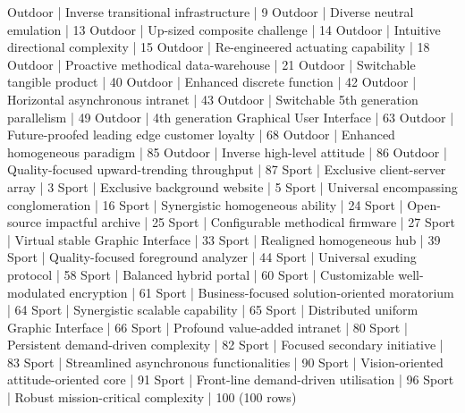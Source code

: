 \begin{pseudo*}
 Outdoor     | Inverse transitional infrastructure              |       9
 Outdoor     | Diverse neutral emulation                        |      13
 Outdoor     | Up-sized composite challenge                     |      14
 Outdoor     | Intuitive directional complexity                 |      15
 Outdoor     | Re-engineered actuating capability               |      18
 Outdoor     | Proactive methodical data-warehouse              |      21
 Outdoor     | Switchable tangible product                      |      40
 Outdoor     | Enhanced discrete function                       |      42
 Outdoor     | Horizontal asynchronous intranet                 |      43
 Outdoor     | Switchable 5th generation parallelism            |      49
 Outdoor     | 4th generation Graphical User Interface          |      63
 Outdoor     | Future-proofed leading edge customer loyalty     |      68
 Outdoor     | Enhanced homogeneous paradigm                    |      85
 Outdoor     | Inverse high-level attitude                      |      86
 Outdoor     | Quality-focused upward-trending throughput       |      87
 Sport       | Exclusive client-server array                    |       3
 Sport       | Exclusive background website                     |       5
 Sport       | Universal encompassing conglomeration            |      16
 Sport       | Synergistic homogeneous ability                  |      24
 Sport       | Open-source impactful archive                    |      25
 Sport       | Configurable methodical firmware                 |      27
 Sport       | Virtual stable Graphic Interface                 |      33
 Sport       | Realigned homogeneous hub                        |      39
 Sport       | Quality-focused foreground analyzer              |      44
 Sport       | Universal exuding protocol                       |      58
 Sport       | Balanced hybrid portal                           |      60
 Sport       | Customizable well-modulated encryption           |      61
 Sport       | Business-focused solution-oriented moratorium    |      64
 Sport       | Synergistic scalable capability                  |      65
 Sport       | Distributed uniform Graphic Interface            |      66
 Sport       | Profound value-added intranet                    |      80
 Sport       | Persistent demand-driven complexity              |      82
 Sport       | Focused secondary initiative                     |      83
 Sport       | Streamlined asynchronous functionalities         |      90
 Sport       | Vision-oriented attitude-oriented core           |      91
 Sport       | Front-line demand-driven utilisation             |      96
 Sport       | Robust mission-critical complexity               |     100
(100 rows)
\end{pseudo*}

